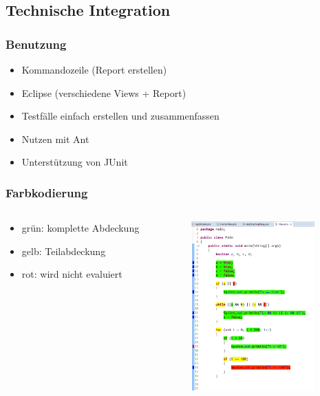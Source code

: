\documentclass{beamer}
\begin{document}
  \subsection{Technische Integration}
  \begin{frame}\frametitle{Benutzung}
    \begin{itemize}[<+->]
      \item Kommandozeile (Report erstellen)
      \item Eclipse (verschiedene Views + Report)
      \item Testfälle einfach erstellen und zusammenfassen
      \item Nutzen mit Ant
      \item Unterstützung von JUnit
    \end{itemize}
  \end{frame}

  \begin{frame}\frametitle{Farbkodierung}
    \begin{columns}
      \begin{column}{5cm}
        \begin{itemize}
          \item grün: komplette Abdeckung
          \item gelb: Teilabdeckung
          \item rot: wird nicht evaluiert
        \end{itemize}
        \vspace{1cm}
      \end{column}
      \begin{column}{5cm}
        \begin{overprint}
          \includegraphics[height=65mm]{pictures/farben.png}
        \end{overprint}
      \end{column}
    \end{columns}
  \end{frame}
\end{document}
